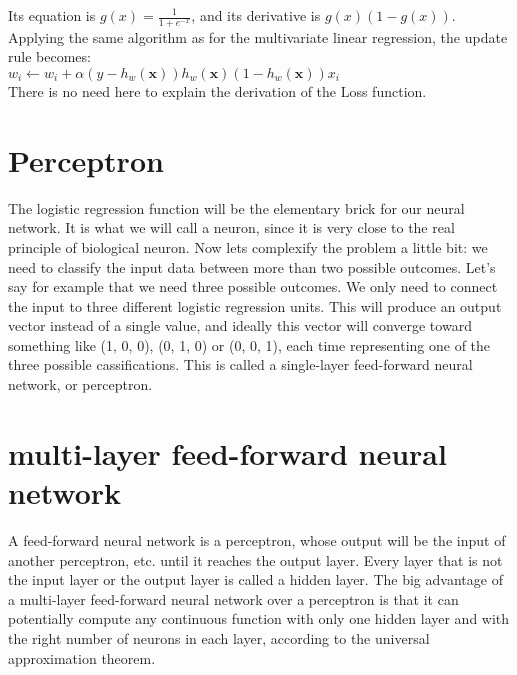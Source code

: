 \documentclass[12pt]{report}
\begin{document}
\begin{center}
\end{center}

Its equation is $g(x) = \frac{1}{1 + e^{-x}}$, and its derivative is
$g(x)(1 - g(x))$. Applying the same algorithm as for the multivariate linear
regression, the update rule becomes:\\

$w_i \leftarrow w_i + \alpha (y - h_w(\textbf{x}))
h_w(\textbf{x})(1 - h_w(\textbf{x}))x_i$\\

There is no need here to explain the derivation of the Loss function.

\section{Perceptron}

The logistic regression function will be the elementary brick for our neural
network. It is what we will call a neuron, since it is very close to the real
principle of biological neuron. Now lets complexify the problem a little bit: we
need to classify the input data between more than two possible outcomes. Let's
say for example that we need three possible outcomes. We only need to connect
the input to three different logistic regression units. This will produce an
output vector instead of a single value, and ideally this vector will converge
toward something like (1, 0, 0), (0, 1, 0) or (0, 0, 1), each time representing
one of the three possible cassifications. This is called a single-layer
feed-forward neural network, or perceptron.\\

\begin{center}
\end{center}

\section{multi-layer feed-forward neural network}

A feed-forward neural network is a perceptron, whose output will be the input of
another perceptron, etc. until it reaches the output layer. Every layer that is
not the input layer or the output layer is called a hidden layer. The big
advantage of a multi-layer feed-forward neural network over a perceptron is that
it can potentially compute any continuous function with only one hidden layer
and with the right number of neurons in each layer, according to the universal
approximation theorem.\\
\end{document}
